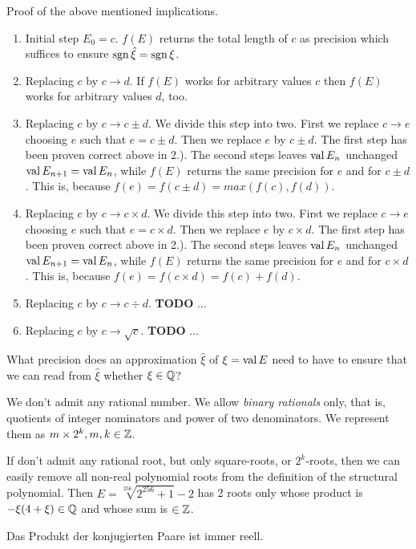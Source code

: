 Proof of the above mentioned implications.
\begin{enumerate}
\item Initial step $E_0=c$.
      $f(E)$ returns the total length of $c$ as precision
	  which suffices to ensure $\operatorname{sgn}\hat\xi=\operatorname{sgn}\xi$.
\item Replacing $c$ by $c\rightarrow d$.
      If $f(E)$ works for arbitrary values $c$
	  then $f(E)$ works for arbitrary values $d$, too.
\item Replacing $c$ by $c\rightarrow c\pm d$.
      We divide this step into two.
	  First we replace $c\rightarrow e$ choosing $e$ such that $e = c\pm d$.
	  Then we replace $e$ by $c\pm d$.
	  The first step has been proven correct above in 2.).
	  The second steps leaves $\mathop{\rm val}\nolimits E_n$ unchanged $\mathop{\rm val}\nolimits E_{n+1}=\mathop{\rm val}\nolimits E_n$,
	  while $f(E)$ returns the same precision for $e$ and for $c\pm d$.
	  This is, because $f(e) = f(c\pm d) = max(f(c), f(d))$.
\item Replacing $c$ by $c\rightarrow c\times d$.
      We divide this step into two.
	  First we replace $c\rightarrow e$ choosing $e$ such that $e = c \times d$.
	  Then we replace $e$ by $c\times d$.
	  The first step has been proven correct above in 2.).
	  The second steps leaves $\mathop{\rm val}\nolimits E_n$ unchanged $\mathop{\rm val}\nolimits E_{n+1}=\mathop{\rm val}\nolimits E_n$,
	  while $f(E)$ returns the same precision for $e$ and for $c\times d$.
	  This is, because $f(e) = f(c\times d) = f(c) + f(d)$.
\item Replacing $c$ by $c\rightarrow c\div d$.
      {\bf TODO} $\ldots$
\item Replacing $c$ by $c\rightarrow \sqrt c$.
      {\bf TODO} $\ldots$
\end{enumerate}


What precision does an approximation $\hat\xi$ of $\xi=\mathop{\rm val}\nolimits E$ need to have to ensure that we can read from $\hat\xi$ whether $\xi\in\mathbb{Q}$?

We don't admit any rational number. We allow {\em binary rationals} only,
that is, quotients of integer nominators and power of two denominators.
We represent them as $m\times 2^k, m, k\in\mathbb{Z}$.

If don't admit any rational root, but only square-roots, or $2^k$-roots,
then we can easily remove all non-real polynomial roots from the definition
of the structural polynomial.
Then $E=\sqrt[256]{2^{256}+1}-2$ 
has 2 roots only whose product is $-\xi(4+\xi)\in\mathbb{Q}$
and whose sum is $\in\mathbb{Z}$.

Das Produkt der konjugierten Paare ist immer reell.